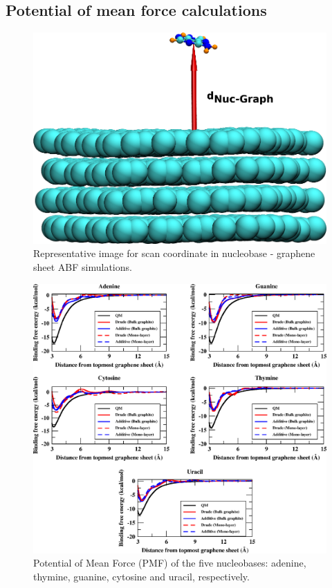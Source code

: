  \subsection{Potential of mean force calculations}
 \begin{figure}
    \centering
    \includegraphics{chapter1/Figures/Figure3.png}
    \caption[Representative image for scan coordinate in nucleobase - graphene sheet ABF simulations]{Representative image for scan coordinate in nucleobase - graphene sheet ABF simulations.}
 \end{figure}
 \begin{figure}
    \centering
    \includegraphics{chapter1/Figures/Figure2.png}
    \caption[Potential of Mean Force (PMF) of the five nucleobases: adenine, thymine, guanine, cytosine and uracil, respectively]{Potential of Mean Force (PMF) of the five nucleobases: adenine, thymine, guanine, cytosine and uracil, respectively.}
 \end{figure}
